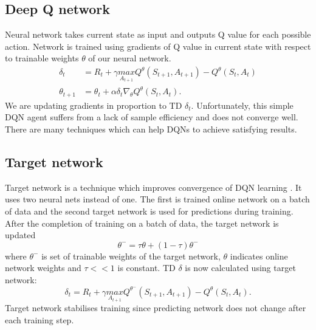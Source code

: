 \subsection{Deep Q network}
Neural network takes current state as input and outputs Q value for each possible action. Network is trained using gradients of Q value in current state with respect to trainable weights $\theta$ of our neural network.
\begin{align}
\delta_t &= R_{t} + \gamma \underset{A_{t+1}}{max}Q^\theta(S_{t+1}, A_{t+1}) - Q^\theta(S_t, A_t)\\
\theta_{t+1} &= \theta_t + \alpha \delta_t \nabla_\theta Q^\theta (S_t, A_t).
\end{align}
We are updating gradients in proportion to TD $\delta_t$. Unfortunately, this simple DQN agent suffers from a lack of sample efficiency and does not converge well. There are many techniques which can help DQNs to achieve satisfying results.

\subsection{Target network}
Target network is a technique which improves convergence of DQN learning \cite{mnih2015}. It uses two neural nets instead of one. The first is trained online network on a batch of data and the second target network is used for predictions during training. After the completion of training on a batch of data, the target network is updated
\begin{equation}
\theta^- = \tau \theta + (1-\tau)\theta^-
\end{equation}
where $\theta^-$ is set of trainable weights of the target network, $\theta$ indicates online network weights and $\tau << 1$ is constant.
TD $\delta$ is now calculated using target network:
\begin{equation}
\delta_t = R_{t} + \gamma \underset{A_{t+1}}{max}Q^{\theta^-}(S_{t+1}, A_{t+1}) - Q^\theta(S_t, A_t). 
\end{equation}
Target network stabilises training since predicting network does not change after each training step.

